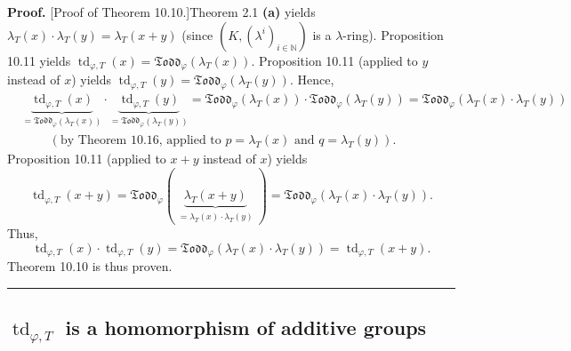 \documentclass[numbers=enddot,12pt,final,onecolumn,notitlepage]{scrartcl}%
\newenvironment{proof}[1][Proof]{\noindent\textbf{#1.} }{\ \rule{0.5em}{0.5em}}
\begin{document}
\begin{proof}
[Proof of Theorem 10.10.]Theorem 2.1 \textbf{(a)} yields $\lambda_{T}\left(
x\right)  \cdot\lambda_{T}\left(  y\right)  =\lambda_{T}\left(  x+y\right)  $
(since $\left(  K,\left(  \lambda^{i}\right)  _{i\in\mathbb{N}}\right)  $ is a
$\lambda$-ring). Proposition 10.11 yields $\operatorname*{td}_{\varphi
,T}\left(  x\right)  =\mathfrak{Todd}_{\varphi}\left(  \lambda_{T}\left(
x\right)  \right)  $. Proposition 10.11 (applied to $y$ instead of $x$) yields
$\operatorname*{td}_{\varphi,T}\left(  y\right)  =\mathfrak{Todd}_{\varphi
}\left(  \lambda_{T}\left(  y\right)  \right)  $. Hence,%
\begin{align*}
&  \underbrace{\operatorname*{td}\nolimits_{\varphi,T}\left(  x\right)
}_{=\mathfrak{Todd}_{\varphi}\left(  \lambda_{T}\left(  x\right)  \right)
}\cdot\underbrace{\operatorname*{td}\nolimits_{\varphi,T}\left(  y\right)
}_{=\mathfrak{Todd}_{\varphi}\left(  \lambda_{T}\left(  y\right)  \right)
}=\mathfrak{Todd}_{\varphi}\left(  \lambda_{T}\left(  x\right)  \right)
\cdot\mathfrak{Todd}_{\varphi}\left(  \lambda_{T}\left(  y\right)  \right)
=\mathfrak{Todd}_{\varphi}\left(  \lambda_{T}\left(  x\right)  \cdot
\lambda_{T}\left(  y\right)  \right) \\
&  \ \ \ \ \ \ \ \ \ \ \left(  \text{by Theorem 10.16, applied to }%
p=\lambda_{T}\left(  x\right)  \text{ and }q=\lambda_{T}\left(  y\right)
\right)  .
\end{align*}
Proposition 10.11 (applied to $x+y$ instead of $x$) yields%
\[
\operatorname*{td}\nolimits_{\varphi,T}\left(  x+y\right)  =\mathfrak{Todd}%
_{\varphi}\left(  \underbrace{\lambda_{T}\left(  x+y\right)  }%
_{\substack{=\lambda_{T}\left(  x\right)  \cdot\lambda_{T}\left(  y\right)
}}\right)  =\mathfrak{Todd}_{\varphi}\left(  \lambda_{T}\left(  x\right)
\cdot\lambda_{T}\left(  y\right)  \right)  .
\]
Thus,%
\[
\operatorname*{td}\nolimits_{\varphi,T}\left(  x\right)  \cdot
\operatorname*{td}\nolimits_{\varphi,T}\left(  y\right)  =\mathfrak{Todd}%
_{\varphi}\left(  \lambda_{T}\left(  x\right)  \cdot\lambda_{T}\left(
y\right)  \right)  =\operatorname*{td}\nolimits_{\varphi,T}\left(  x+y\right)
.
\]
Theorem 10.10 is thus proven.
\end{proof}

\subsection{ $\operatorname*{td}_{\varphi,T}$ is a homomorphism of additive
groups}
\end{document}
